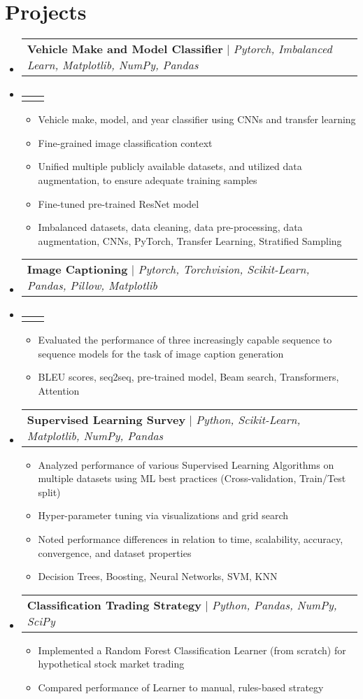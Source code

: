 \documentclass[letterpaper,11pt]{article}
\makeatletter
\newcommand{\resumeItem}[1]{
  \item\small{
    {#1 \vspace{-2pt}}
  }
}
\newcommand{\resumeProjectHeading}[2]{
    \item
    \begin{tabular*}{0.97\textwidth}{l@{\extracolsep{\fill}}r}
      \small#1 & #2 \\
    \end{tabular*}\vspace{-7pt}
}
\newcommand{\resumeSubHeadingListStart}{\begin{itemize}[leftmargin=0.15in, label={}]}
\newcommand{\resumeSubHeadingListEnd}{\end{itemize}}
\newcommand{\resumeItemListStart}{\begin{itemize}}
\newcommand{\resumeItemListEnd}{\end{itemize}\vspace{-5pt}}
\makeatother
\begin{document}
\section{Projects}
    \resumeSubHeadingListStart
      \resumeProjectHeading
          {\textbf{Vehicle Make and Model Classifier} $|$ \emph{Pytorch, Imbalanced Learn, Matplotlib, NumPy, Pandas}}{}
      \resumeProjectHeading
          {\faGithub{ \href{https://github.com/Pells31/Vehicle-Make-and-Model-Recognition}{github.com/Pells31/Vehicle-Make-and-Model-Recognition}}}{}
          \resumeItemListStart
            \resumeItem{Vehicle make, model, and year classifier using CNNs and transfer learning}
            \resumeItem{Fine-grained image classification context}
            \resumeItem{Unified multiple publicly available datasets, and utilized data augmentation, to ensure adequate training samples}
            \resumeItem{Fine-tuned pre-trained ResNet model}
            \resumeItem{Imbalanced datasets, data cleaning, data pre-processing, data augmentation, CNNs, PyTorch, Transfer Learning, Stratified Sampling}
          \resumeItemListEnd
      \resumeProjectHeading
          {\textbf{Image Captioning} $|$ \emph{Pytorch, Torchvision, Scikit-Learn, Pandas, Pillow, Matplotlib}}{}
      \resumeProjectHeading
          {\faGithub{ \href{https://github.com/Pells31/Image-Captioning}{github.com/Pells31/Image-Captioning}}}{}
          \resumeItemListStart
            \resumeItem{Evaluated the performance of three increasingly capable sequence to sequence models for the task of image caption generation}
            \resumeItem{BLEU scores, seq2seq, pre-trained model, Beam search, Transformers, Attention}
          \resumeItemListEnd
      \resumeProjectHeading
          {\textbf{Supervised Learning Survey} $|$ \emph{Python, Scikit-Learn, Matplotlib, NumPy, Pandas}}{}
          \resumeItemListStart
            \resumeItem{Analyzed performance of various Supervised Learning Algorithms on multiple datasets using ML best practices (Cross-validation, Train/Test split)}
            \resumeItem{Hyper-parameter tuning via visualizations and grid search}
            \resumeItem{Noted performance differences in relation to time, scalability, accuracy, convergence, and dataset properties}
            \resumeItem{Decision Trees, Boosting, Neural Networks,  SVM, KNN}
          \resumeItemListEnd
      \resumeProjectHeading
          {\textbf{Classification Trading Strategy} $|$ \emph{Python, Pandas, NumPy, SciPy}}{}
          \resumeItemListStart
            \resumeItem{Implemented a Random Forest Classification Learner (from scratch) for hypothetical stock market trading}
            \resumeItem{Compared performance of Learner to manual, rules-based strategy}
          \resumeItemListEnd
    \resumeSubHeadingListEnd
\end{document}
